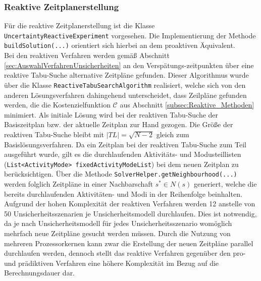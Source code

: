 \subsubsection{Reaktive Zeitplanerstellung}
\label{subsec:ReaktiveZeitplanerstellung}

Für die reaktive Zeitplanerstellung ist die Klasse \lstinline|UncertaintyReactiveExperiment| vorgesehen. Die Implementierung der Methode \lstinline|buildSolution(...)| orientiert sich hierbei an dem proaktiven Äquivalent. \\

Bei den reaktiven Verfahren werden gemäß Abschnitt \ref{sec:AuswahlVerfahrenUnsicherheiten} an den Verspätungs-zeitpunkten über eine reaktive Tabu-Suche alternative Zeitpläne gefunden. Dieser Algorithmus wurde über die Klasse \lstinline|ReactiveTabuSearchAlgorithm| realisiert, welche sich von den anderen Lösungsverfahren dahingehend unterscheidet, dass Zeilpläne gefunden werden, die die Kostenzielfunktion $\mathcal{C}$ aus Abschnitt \ref{subsec:Reaktive_Methoden} minimiert. Als initiale Lösung wird bei der reaktiven Tabu-Suche der Basiszeitplan bzw. der aktuelle Zeitplan zur Hand gezogen. Die Größe der reaktiven Tabu-Suche bleibt mit $|TL| = \sqrt{N - 2}$ gleich zum Basislösungsverfahren. Da ein Zeitplan bei der reaktiven Tabu-Suche zum Teil ausgeführt wurde, gilt es die durchlaufenden Aktivitäts- und Modusteillisten (\lstinline|List<ActivityMode> fixedActivityModeList|) bei dem neuen Zeitplan zu berücksichtigen. Über die Methode \lstinline|SolverHelper.getNeighbourhood(...)| werden folglich Zeitpläne in einer Nachbarschaft $s^* \in N(s)$ generiert, welche die bereits durchlaufenden Aktivitäten- und Modi in der Reihenfolge beinhalten. \\

Aufgrund der hohen Komplexität der reaktiven Verfahren werden 12 anstelle von 50 Unsicherheitsszenarien je Unsicherheitsmodell durchlaufen. Dies ist notwendig, da je nach Unsicherheitsmodell für jedes Unsicherheitsszenario womöglich mehrfach neue Zeitpläne gesucht werden müssen. Durch die Nutzung von mehreren Prozessorkernen kann zwar die Erstellung der neuen Zeitpläne parallel durchlaufen werden, dennoch stellt das reaktive Verfahren gegenüber den pro- und prädiktiven Verfahren eine höhere Komplexität im Bezug auf die Berechnungsdauer dar. 